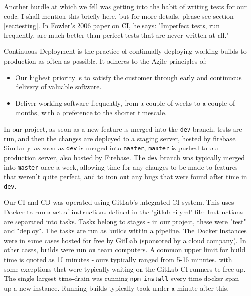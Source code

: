 \documentclass{l3proj}
\begin{document}
Another hurdle at which we fell was getting into the habit of writing tests for our code. I shall
 mention this briefly here, but for more details, please see section \ref{sec:testing}. In Fowler's
 2006 paper on CI, he says: "Imperfect tests, run frequently, are much better than perfect tests
 that are never written at all."\cite{fowler2006continuous}

Continuous Deployment is the practice of continually deploying working builds to production
 as often as possible. It adheres to the Agile principles of:
 \begin{itemize}
 \item
 Our highest priority is to satisfy the customer
 through early and continuous delivery
 of valuable software. \cite{agileprinciples}
 \item
 Deliver working software frequently, from a
 couple of weeks to a couple of months, with a
 preference to the shorter timescale. \cite{agileprinciples}
 \end{itemize}
 In our project, as soon as a new feature is merged into the \texttt{dev} branch,
 tests are run, and then the changes are deployed to a staging server, hosted by firebase. Similarly,
 as soon as \texttt{dev} is merged into \texttt{master}, \texttt{master} is pushed to our production server, also hosted by Firebase.
 The \texttt{dev} branch was typically merged into \texttt{master} once a week, allowing time for any changes to be made
 to features that weren't quite perfect, and to iron out any bugs that were found after time in \texttt{dev}.

Our CI and CD was operated using GitLab's integrated CI system. This uses Docker to
 run a set of instructions defined in the 'gitlab-ci.yml' file.  Instructions are
 separated into tasks. Tasks belong to stages - in our project, these were
 "test" and "deploy". The tasks are run as builds within a pipeline. The Docker instances were
 in some cases hosted for free by GitLab (sponsored by a cloud company). In other cases,
 builds were run on team computers. A common upper limit for build time is quoted as
 10 minutes\cite{fowler2006continuous} - ours typically ranged from 5-15 minutes, with some exceptions that were
 typically waiting on the GitLab CI runners to free up. The single largest time-drain was
 running \texttt{npm install} every time docker span up a new instance. Running builds
 typically took under a minute after this.

 
\end{document}
